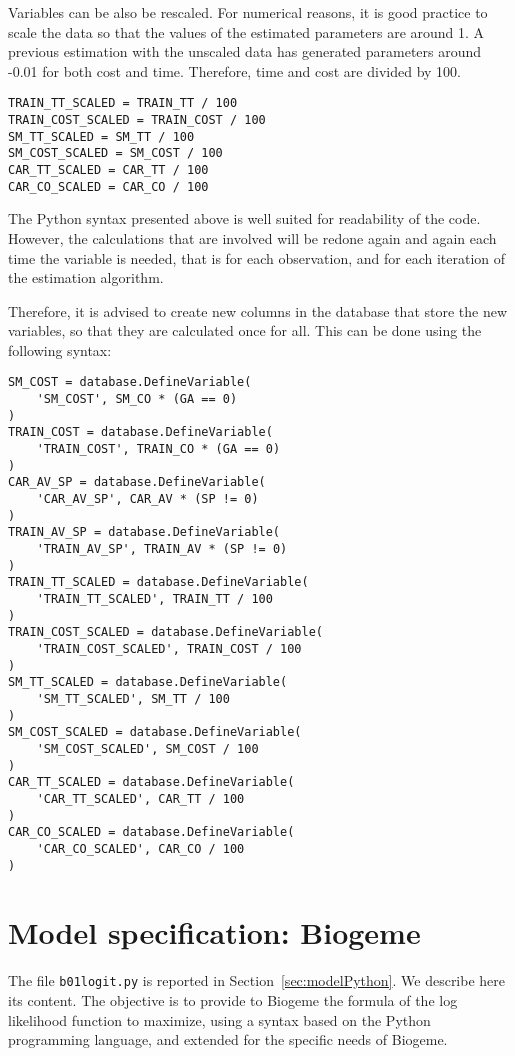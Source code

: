 \documentclass[12pt,a4paper]{article}
\begin{document}
Variables can be also be rescaled. For numerical reasons, it is good
practice to scale the data so that the values of the estimated parameters are around 1. A previous estimation with the unscaled data has generated
parameters around -0.01 for both cost and time. Therefore, 
time and cost are divided by 100.

\begin{lstlisting}[style=nonumbers]
TRAIN_TT_SCALED = TRAIN_TT / 100
TRAIN_COST_SCALED = TRAIN_COST / 100
SM_TT_SCALED = SM_TT / 100
SM_COST_SCALED = SM_COST / 100
CAR_TT_SCALED = CAR_TT / 100
CAR_CO_SCALED = CAR_CO / 100
\end{lstlisting}

The Python syntax presented above is well suited for readability of the code. However, the calculations that are involved will be redone again and again each time the variable is needed, that is for each observation, and for each iteration of the estimation algorithm.

Therefore, it is advised to create new columns in the database that store the new variables, so that they are calculated once for all. This can be done using the following syntax: 

\begin{lstlisting}[style=nonumbers]
SM_COST = database.DefineVariable(
    'SM_COST', SM_CO * (GA == 0)
)
TRAIN_COST = database.DefineVariable(
    'TRAIN_COST', TRAIN_CO * (GA == 0)
)
CAR_AV_SP = database.DefineVariable(
    'CAR_AV_SP', CAR_AV * (SP != 0)
)
TRAIN_AV_SP = database.DefineVariable(
    'TRAIN_AV_SP', TRAIN_AV * (SP != 0)
)
TRAIN_TT_SCALED = database.DefineVariable(
    'TRAIN_TT_SCALED', TRAIN_TT / 100
)
TRAIN_COST_SCALED = database.DefineVariable(
    'TRAIN_COST_SCALED', TRAIN_COST / 100
)
SM_TT_SCALED = database.DefineVariable(
    'SM_TT_SCALED', SM_TT / 100
)
SM_COST_SCALED = database.DefineVariable(
    'SM_COST_SCALED', SM_COST / 100
)
CAR_TT_SCALED = database.DefineVariable(
    'CAR_TT_SCALED', CAR_TT / 100
)
CAR_CO_SCALED = database.DefineVariable(
    'CAR_CO_SCALED', CAR_CO / 100
)
\end{lstlisting}

\section{Model specification: Biogeme}
\label{sec:mod}

The file \lstinline$b01logit.py$ is reported in
Section~\ref{sec:modelPython}. We describe here its content. 
The objective is to provide to Biogeme the formula of the log
likelihood function to maximize, using a syntax based on the Python
programming language, and extended for the specific needs of Biogeme.
\end{document}
